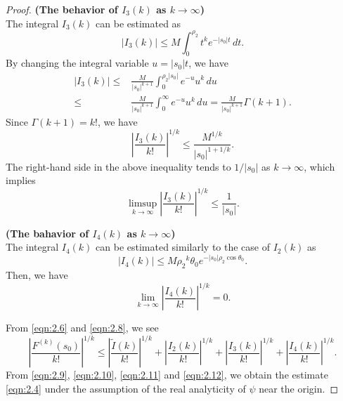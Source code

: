 \documentclass[12pt]{amsart}
\numberwithin{equation}{section}
\theoremstyle{definition}
\theoremstyle{remark}
\newcommand{\1}{{\bf 1}}
\begin{document}
\begin{proof}
{\bf (The behavior of $I_3(k)$ as $k\to\infty$)} \\
The integral $I_3(k)$ can be estimated as
\begin{equation*}
|I_3(k)|
\le M\int_0^{\rho_2} t^k e^{-|s_0|t}\,dt.
\end{equation*}
By changing the integral variable $u=|s_0|t$,
we have
\begin{equation*}
\begin{split}
|I_3(k)|
\le &\frac{M}{|s_0|^{k+1}}
\int_0^{\rho_2 |s_0|} e^{-u} u^k \,du \\
\le &\frac{M}{|s_0|^{k+1}}
\int_0^{\infty} e^{-u} u^k \,du 
=\frac{M}{|s_0|^{k+1}}\Gamma(k+1).
\end{split}
\end{equation*}
Since $\Gamma(k+1)=k!$,
we have
\begin{equation*}
\left|\frac{I_3(k)}{k!} \right|^{1/k} 
\le \frac{M^{1/k}}{|s_0|^{1+1/k}}. 
\end{equation*}
The right-hand side in the above inequality 
tends to $1/|s_0|$ as $k \to \infty$,
which implies
\begin{equation}\label{eqn:2.11}
\limsup_{k\to \infty}
\left|\frac{I_3(k)}{k!}\right|^{1/k}\leq \frac{1}{|s_0|}.
\end{equation}

{\bf (The bahavior of $I_4(k)$ as $k\to\infty$)} \\
The integral $I_4(k)$ 
can be estimated similarly to the case of 
$I_2(k)$ as
\begin{equation*}
|I_4(k)|
\le M {\rho_2}^k \theta_0 e^{-|s_0|\rho_2 \cos\theta_0}.
\end{equation*}
Then, we have
\begin{equation}\label{eqn:2.12}
\lim_{k\to \infty}\left|\frac{I_4(k)}{k!}\right|^{1/k}
=0.
\end{equation}

From \eqref{eqn:2.6} and \eqref{eqn:2.8}, we see
\begin{equation}\label{eqn:2.13}
\left| \frac{F^{(k)}(s_0)}{k!} \right|^{1/k}
\le \left| \frac{\tilde{I}(k)}{k!} \right|^{1/k}
+\left| \frac{I_2(k)}{k!} \right|^{1/k}
+\left| \frac{I_3(k)}{k!} \right|^{1/k}
+\left| \frac{I_4(k)}{k!} \right|^{1/k}.
\end{equation}
From
\eqref{eqn:2.9}, \eqref{eqn:2.10}, 
\eqref{eqn:2.11} and \eqref{eqn:2.12},
we obtain the estimate \eqref{eqn:2.4}
under the assumption of 
the real analyticity of $\psi$ near the origin.


\end{proof}
\end{document}
